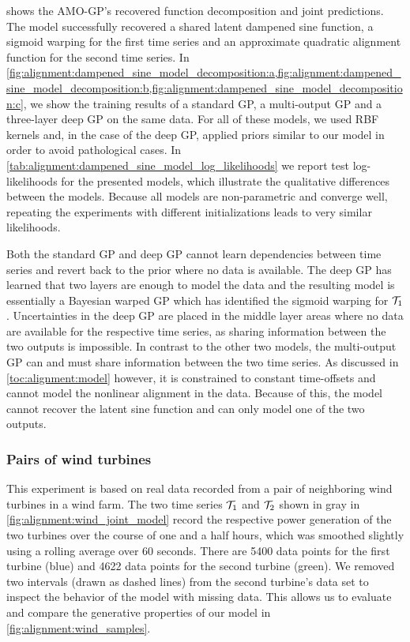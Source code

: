  shows the AMO-GP's recovered function decomposition and joint predictions.
The model successfully recovered a shared latent dampened sine function, a sigmoid warping for the first time series and an approximate quadratic alignment function for the second time series.
In \cref{fig:alignment:dampened_sine_model_decomposition:a,fig:alignment:dampened_sine_model_decomposition:b,fig:alignment:dampened_sine_model_decomposition:c}, we show the training results of a standard GP, a multi-output GP and a three-layer deep GP on the same data.
For all of these models, we used RBF kernels and, in the case of the deep GP, applied priors similar to our model in order to avoid pathological cases.
In \cref{tab:alignment:dampened_sine_model_log_likelihoods} we report test log-likelihoods for the presented models, which illustrate the qualitative differences between the models.
Because all models are non-parametric and converge well, repeating the experiments with different initializations leads to very similar likelihoods.

Both the standard GP and deep GP cannot learn dependencies between time series and revert back to the prior where no data is available.
The deep GP has learned that two layers are enough to model the data and the resulting model is essentially a Bayesian warped GP which has identified the sigmoid warping for $\mathcal{T}_1$.
Uncertainties in the deep GP are placed in the middle layer areas where no data are available for the respective time series, as sharing information between the two outputs is impossible.
In contrast to the other two models, the multi-output GP can and must share information between the two time series.
As discussed in \cref{toc:alignment:model} however, it is constrained to constant time-offsets and cannot model the nonlinear alignment in the data.
Because of this, the model cannot recover the latent sine function and can only model one of the two outputs.


\subsubsection{Pairs of wind turbines}
This experiment is based on real data recorded from a pair of neighboring wind turbines in a wind farm.
The two time series $\mathcal{T}_1$ and $\mathcal{T}_2$ shown in gray in \cref{fig:alignment:wind_joint_model} record the respective power generation of the two turbines over the course of one and a half hours, which was smoothed slightly using a rolling average over 60 seconds.
There are 5400 data points for the first turbine (blue) and 4622 data points for the second turbine (green).
We removed two intervals (drawn as dashed lines) from the second turbine's data set to inspect the behavior of the model with missing data.
This allows us to evaluate and compare the generative properties of our model in \cref{fig:alignment:wind_samples}.

